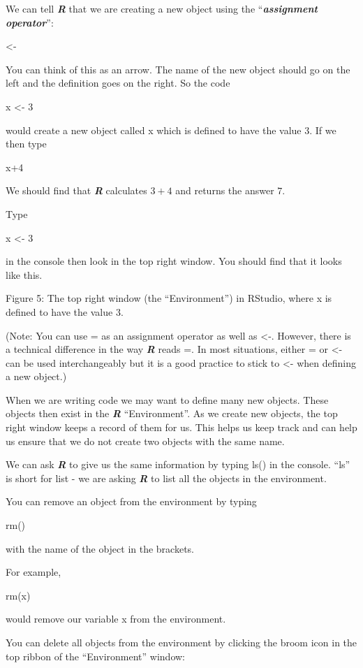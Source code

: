 \documentclass[
]{book}
\begin{document}
We can tell \textbf{\emph{R}} that we are creating a new object using the ``\textbf{\emph{assignment operator}}'':

\textless-

You can think of this as an arrow. The name of the new object should go on the left and the definition goes on the right. So the code

x \textless- 3

would create a new object called x which is defined to have the value \(3\). If we then type

x+4

We should find that \textbf{\emph{R}} calculates \(3+4\) and returns the answer \(7\).

Type

x \textless- 3

in the console then look in the top right window. You should find that it looks like this.

Figure 5: The top right window (the ``Environment'') in RStudio, where x is defined to have the value \(3\).

(Note: You can use = as an assignment operator as well as \textless-. However, there is a technical difference in the way \textbf{\emph{R}} reads =. In most situations, either = or \textless- can be used interchangeably but it is a good practice to stick to \textless- when defining a new object.)

When we are writing code we may want to define many new objects. These objects then exist in the \textbf{\emph{R}} ``Environment''. As we create new objects, the top right window keeps a record of them for us. This helps us keep track and can help us ensure that we do not create two objects with the same name.

We can ask \textbf{\emph{R}} to give us the same information by typing ls() in the console. ``ls'' is short for list - we are asking \textbf{\emph{R}} to list all the objects in the environment.

You can remove an object from the environment by typing

rm()

with the name of the object in the brackets.

For example,

rm(x)

would remove our variable x from the environment.

You can delete all objects from the environment by clicking the broom icon in the top ribbon of the ``Environment'' window:
\end{document}
